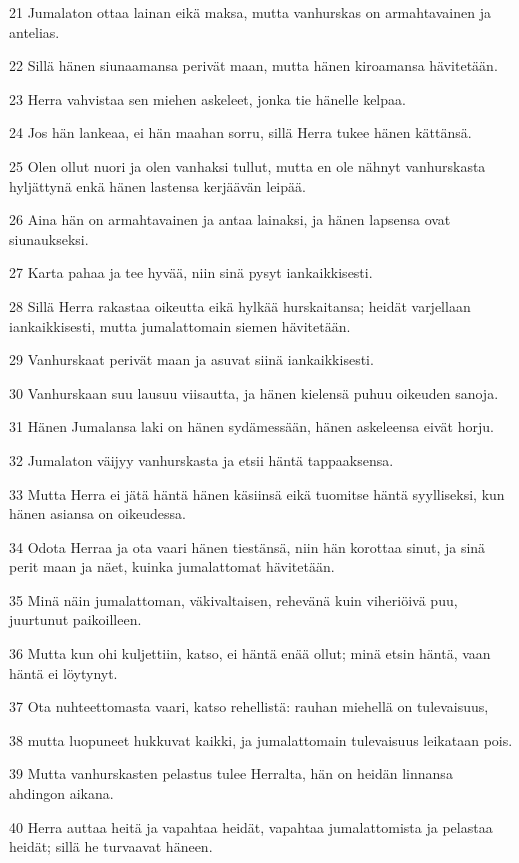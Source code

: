 \par 21 Jumalaton ottaa lainan eikä maksa, mutta vanhurskas on armahtavainen ja antelias.
\par 22 Sillä hänen siunaamansa perivät maan, mutta hänen kiroamansa hävitetään.
\par 23 Herra vahvistaa sen miehen askeleet, jonka tie hänelle kelpaa.
\par 24 Jos hän lankeaa, ei hän maahan sorru, sillä Herra tukee hänen kättänsä.
\par 25 Olen ollut nuori ja olen vanhaksi tullut, mutta en ole nähnyt vanhurskasta hyljättynä enkä hänen lastensa kerjäävän leipää.
\par 26 Aina hän on armahtavainen ja antaa lainaksi, ja hänen lapsensa ovat siunaukseksi.
\par 27 Karta pahaa ja tee hyvää, niin sinä pysyt iankaikkisesti.
\par 28 Sillä Herra rakastaa oikeutta eikä hylkää hurskaitansa; heidät varjellaan iankaikkisesti, mutta jumalattomain siemen hävitetään.
\par 29 Vanhurskaat perivät maan ja asuvat siinä iankaikkisesti.
\par 30 Vanhurskaan suu lausuu viisautta, ja hänen kielensä puhuu oikeuden sanoja.
\par 31 Hänen Jumalansa laki on hänen sydämessään, hänen askeleensa eivät horju.
\par 32 Jumalaton väijyy vanhurskasta ja etsii häntä tappaaksensa.
\par 33 Mutta Herra ei jätä häntä hänen käsiinsä eikä tuomitse häntä syylliseksi, kun hänen asiansa on oikeudessa.
\par 34 Odota Herraa ja ota vaari hänen tiestänsä, niin hän korottaa sinut, ja sinä perit maan ja näet, kuinka jumalattomat hävitetään.
\par 35 Minä näin jumalattoman, väkivaltaisen, rehevänä kuin viheriöivä puu, juurtunut paikoilleen.
\par 36 Mutta kun ohi kuljettiin, katso, ei häntä enää ollut; minä etsin häntä, vaan häntä ei löytynyt.
\par 37 Ota nuhteettomasta vaari, katso rehellistä: rauhan miehellä on tulevaisuus,
\par 38 mutta luopuneet hukkuvat kaikki, ja jumalattomain tulevaisuus leikataan pois.
\par 39 Mutta vanhurskasten pelastus tulee Herralta, hän on heidän linnansa ahdingon aikana.
\par 40 Herra auttaa heitä ja vapahtaa heidät, vapahtaa jumalattomista ja pelastaa heidät; sillä he turvaavat häneen.

